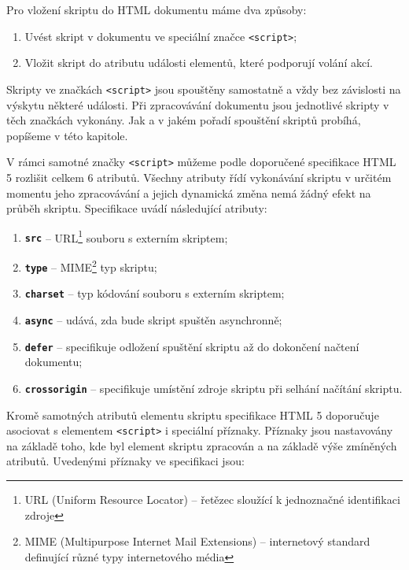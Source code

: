 \noindent Pro vložení skriptu do HTML dokumentu máme dva způsoby:

\begin{enumerate}
  \item Uvést skript v dokumentu ve speciální značce \texttt{<script>};
  \item Vložit skript do atributu události elementů, které podporují volání akcí. 
\end{enumerate}

Skripty ve značkách \texttt{<script>} jsou spouštěny samostatně a vždy bez závislosti na výskytu některé události. Při zpracovávání dokumentu jsou jednotlivé skripty v těch značkách vykonány. Jak a v jakém pořadí spouštění skriptů probíhá, popíšeme v této kapitole.

V rámci samotné značky \texttt{<script>} můžeme podle doporučené specifikace HTML 5 rozlišit celkem 6 atributů. Všechny atributy řídí vykonávání skriptu v určitém momentu jeho zpracovávání a jejich dynamická změna nemá žádný efekt na průběh skriptu. Specifikace uvádí následující atributy:

\begin{enumerate}
  \item \textbf{\texttt{src}} -- URL\footnote{URL (Uniform Resource Locator) -- řetězec sloužící k jednoznačné identifikaci zdroje} souboru s externím skriptem;
  \item \textbf{\texttt{type}} -- MIME\footnote{MIME (Multipurpose Internet Mail Extensions) -- internetový standard definující různé typy internetového média} typ skriptu;
  \item \textbf{\texttt{charset}} -- typ kódování souboru s externím skriptem;
  \item \textbf{\texttt{async}} -- udává, zda bude skript spuštěn asynchronně;
  \item \textbf{\texttt{defer}} -- specifikuje odložení spuštění skriptu až do dokončení načtení dokumentu;
  \item \textbf{\texttt{crossorigin}} -- specifikuje umístění zdroje skriptu při selhání načítání skriptu. 
\end{enumerate}

Kromě samotných atributů elementu skriptu specifikace HTML 5 doporučuje asociovat s elementem \texttt{<script>} i speciální příznaky. Příznaky jsou nastavovány na základě toho, kde byl element skriptu zpracován a na základě výše zmíněných atributů. Uvedenými příznaky ve specifikaci jsou:

